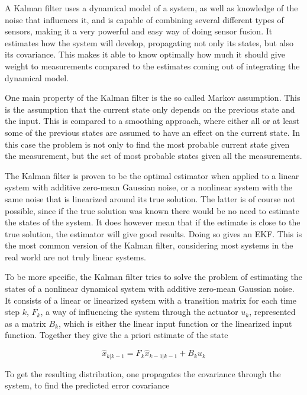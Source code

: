 A Kalman filter uses a dynamical model of a system, as well as knowledge of the noise that influences it, and is capable of combining several different types of sensors, making it a very powerful and easy way of doing sensor fusion. It estimates how the system will develop, propagating not only its states, but also its covariance. This makes it able to know optimally how much it should give weight to measurements compared to the estimates coming out of integrating the dynamical model. 

One main property of the Kalman filter is the so called Markov assumption. This is the assumption that the current state only depends on the previous state and the input. This is compared to a smoothing approach, where either all or at least some of the previous states are assumed to have an effect on the current state. In this case the problem is not only to find the most probable current state given the measurement, but the set of most probable states given all the measurements. 

The Kalman filter is proven to be the optimal estimator when applied to a linear system with additive zero-mean Gaussian noise, or a nonlinear system with the same noise that is linearized around its true solution. The latter is of course not possible, since if the true solution was known there would be no need to estimate the states of the system. It does however mean that if the estimate is close to the true solution, the estimator will give good results. Doing so gives an \gls{EKF}\cite{EKF}. This is the most common version of the Kalman filter, considering most systems in the real world are not truly linear systems.  


To be more specific, the Kalman filter tries to solve the problem of estimating the states of a nonlinear dynamical system with additive zero-mean Gaussian noise. It consists of a linear or linearized system with a transition matrix for each time step $k$, $F_{k}$, a way of influencing the system through the actuator $u_k$, represented as a matrix $B_{k}$, which is either the linear input function or the linearized input function. Together they give the a priori estimate of the state

\begin{equation}
    \hat{x}_{k|k-1} = F_k\hat{x}_{k-1|k-1} + B_k u_k
\end{equation}

To get the resulting distribution, one propagates the covariance through the system, to find the predicted error covariance


